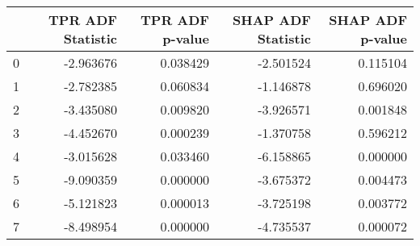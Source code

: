 \begin{tabular}{lrrrr}
\toprule
 & TPR ADF Statistic & TPR ADF p-value & SHAP ADF Statistic & SHAP ADF p-value \\
\midrule
0 & -2.963676 & 0.038429 & -2.501524 & 0.115104 \\
1 & -2.782385 & 0.060834 & -1.146878 & 0.696020 \\
2 & -3.435080 & 0.009820 & -3.926571 & 0.001848 \\
3 & -4.452670 & 0.000239 & -1.370758 & 0.596212 \\
4 & -3.015628 & 0.033460 & -6.158865 & 0.000000 \\
5 & -9.090359 & 0.000000 & -3.675372 & 0.004473 \\
6 & -5.121823 & 0.000013 & -3.725198 & 0.003772 \\
7 & -8.498954 & 0.000000 & -4.735537 & 0.000072 \\
\bottomrule
\end{tabular}
